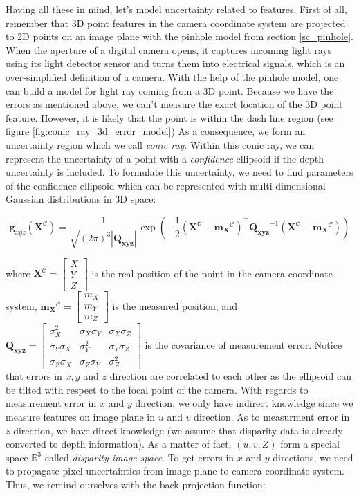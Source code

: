 \documentclass[12pt]{report}
\numberwithin{figure}{section}
\newcommand{\R}{\mathbb{R}}
\begin{document}
Having all these in mind, let's model uncertainty related to features.  First
of all, remember that 3D point features in the camera coordinate system are
projected to 2D points on an image plane with the pinhole model from section
\ref{sc_pinhole}.  When the aperture of a digital camera opens, it captures
incoming light rays using its light detector sensor and turns them into 
electrical signals, which is an over-simplified
definition of a camera. With the help of the pinhole model, one can build a
model for light ray coming from a 3D point.  Because we have the errors as
mentioned above, we can't measure the exact location of the 3D point feature.
However, it is likely that the point is within the dash line region (see figure
\ref{fig:conic_ray_3d_error_model}) As a consequence, we form an uncertainty
region which we call \textit{conic ray}.  Within this conic ray, we can
represent the uncertainty of a point with a \textit{confidence} ellipsoid if
the depth uncertainty is included.  To formulate this uncertainty, we need to
find parameters of the confidence ellipsoid which can be represented with
multi-dimensional Gaussian distributions in 3D space:

\begin{equation} \mathbf{g}_{xyz}(\mathbf{X}^{\mathcal{C}}) =
\frac{1}{\sqrt{(2\pi)^3|\mathbf{Q_{xyz}}|}} \exp(-\frac{1}{2}
(\mathbf{X}^{\mathcal{C}}-\mathbf{m_X}^{\mathcal{C}})^\top
\mathbf{Q_{xyz}}^{-1} (\mathbf{X}^{\mathcal{C}}-\mathbf{m_X}^{\mathcal{C}}))
\end{equation} \label{eq:cov_ellipse}

where $\mathbf{X}^{\mathcal{C}} = \begin{bmatrix} X \\ Y \\ Z\end{bmatrix}$ is
the real position of the point in the camera coordinate system,
$\mathbf{m_X}^{\mathcal{C}} = \begin{bmatrix} m_X \\ m_Y \\ m_Z \end{bmatrix}$
is the measured position, and $\mathbf{Q_{xyz}} = \begin{bmatrix} \sigma_X^2 &
\sigma_X\sigma_Y & \sigma_X\sigma_Z \\ \sigma_Y\sigma_X & \sigma_Y^2 &
\sigma_Y\sigma_Z\\ \sigma_Z\sigma_X & \sigma_Z\sigma_Y &
\sigma_Z^2\end{bmatrix}$ is the covariance of measurement error.  Notice that
errors in $x,y$ and $z$ direction are correlated to each other as the ellipsoid
can be tilted with respect to the focal point of the camera.  With regards to
measurement error in $x$ and $y$ direction, we only have indirect knowledge
since we measure features on image plane in $u$ and $v$ direction.  As to
measurment error in $z$ direction, we have direct knowledge (we assume that
disparity data is already converted to depth information).  As a matter of
fact, $(u,v,Z)$ form a special space $\R^3$ called \textit{disparity image
space}.  To get errors in $x$ and $y$ directions, we need to propagate pixel
uncertainties from image plane to camera coordinate system. Thus, we remind
ourselves with the back-projection function:
\end{document}
